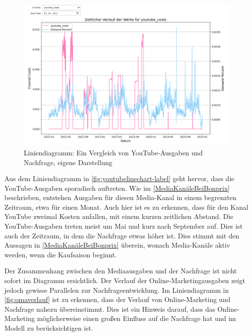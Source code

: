 \begin{figure}[ht]
    \centering
    \includegraphics[width=0.98\linewidth]{images/youtubeLineChart.png}
    \caption{Liniendiagramm: Ein Vergleich von YouTube-Ausgaben und Nachfrage, eigene Darstellung}
    \label{fig:youtubelinechart-label}
\end{figure}
\noindent
Aus dem Liniendiagramm in \autoref{fig:youtubelinechart-label} geht hervor, dass die YouTube-Ausgaben sporadisch auftreten. Wie im \autoref{MediaKanäleBeiBonprix} beschrieben, entstehen Ausgaben für diesen Media-Kanal in einem begrenzten Zeitraum, etwa für einen Monat. Auch hier ist es zu erkennen, dass für den Kanal YouTube zweimal Kosten anfallen, mit einem kurzen zeitlichen Abstand. Die YouTube-Ausgaben treten meist um Mai und kurz nach September auf. Dies ist auch der Zeitraum, in dem die Nachfrage etwas höher ist. Dies stimmt mit den Aussagen in \autoref{MediaKanäleBeiBonprix} überein, wonach Media-Kanäle aktiv werden, wenn die Kaufsaison beginnt. \par
Der Zusammenhang zwischen den Mediaausgaben und der Nachfrage ist nicht sofort im Diagramm ersichtlich. Der Verlauf der Online-Marketingausgaben zeigt jedoch gewisse Parallelen zur Nachfrageentwicklung. Im Liniendiagramm in \autoref{fig:omaverlauf} ist zu erkennen, dass der Verlauf von Online-Marketing und Nachfrage nahezu übereinstimmt. Dies ist ein Hinweis darauf, dass das Online-Marketing möglicherweise einen großen Einfluss auf die Nachfrage hat und im Modell zu berücksichtigen ist.
